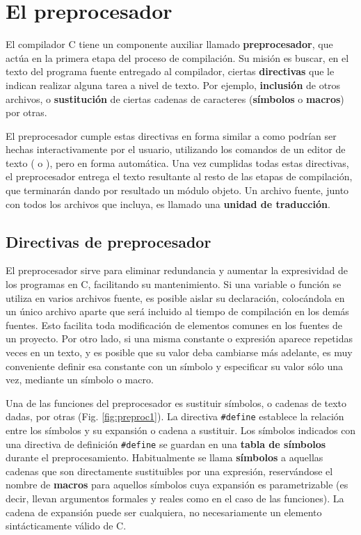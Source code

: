 \chapter{El preprocesador}
El compilador C tiene un componente auxiliar llamado \textbf{preprocesador}, que actúa en la primera etapa
del proceso de compilación. Su misión es buscar, en el texto del programa fuente entregado al
compilador, ciertas \textbf{directivas} que le indican realizar alguna tarea a nivel de texto. Por ejemplo,
\textbf{inclusión} de otros archivos, o \textbf{sustitución} de ciertas cadenas de caracteres (\textbf{símbolos} o \textbf{macros}) por otras. 

El preprocesador cumple estas directivas en forma similar a como podrían ser hechas
interactivamente por el usuario, utilizando los comandos de un editor de texto ( o ), pero en forma automática.
Una vez cumplidas todas estas directivas, el preprocesador entrega el texto resultante al resto de las etapas de compilación, que terminarán dando por resultado un módulo objeto. Un archivo fuente, junto con todos los archivos que incluya, es llamado una \textbf{unidad de traducción}.

\section*{Directivas de preprocesador}
El preprocesador sirve para eliminar redundancia y aumentar la expresividad de los programas en C,
facilitando su mantenimiento. Si una variable o función se utiliza en varios archivos fuente, es posible
aislar su declaración, colocándola en un único archivo aparte que será incluido al tiempo de
compilación en los demás fuentes. Esto facilita toda modificación de elementos comunes en los fuentes
de un proyecto. Por otro lado, si una misma constante o expresión aparece repetidas veces en un texto,
y es posible que su valor deba cambiarse más adelante, es muy conveniente definir esa constante con
un símbolo y especificar su valor sólo una vez, mediante un símbolo o macro.

Una de las funciones del preprocesador es sustituir
símbolos, o cadenas de texto dadas, por otras (Fig. \ref{fig:preproc1}). La directiva
\texttt{\#define} establece la relación entre los símbolos y su
expansión o cadena a sustituir. Los símbolos indicados con una directiva de definición \texttt{\#define} se guardan en una \textbf{tabla de símbolos} durante el preprocesamiento. Habitualmente se llama \textbf{símbolos} a aquellas cadenas que son
directamente sustituibles por una expresión, reservándose el nombre de \textbf{macros} para aquellos símbolos
cuya expansión es parametrizable (es decir, llevan argumentos formales y reales como en el caso de
las funciones). La cadena de expansión puede ser cualquiera, no necesariamente un elemento
sintácticamente válido de C.

